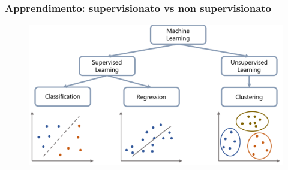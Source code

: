 \begin{frame}

	\frametitle{Apprendimento: supervisionato vs non supervisionato}

	\begin{block}{}
		\begin{figure}[!htbp]
			\centering
			\includegraphics[width=12cm]{images/glossary/supervised_vs_unsupervised_3.png}
		\end{figure}

	\end{block}

\end{frame}



